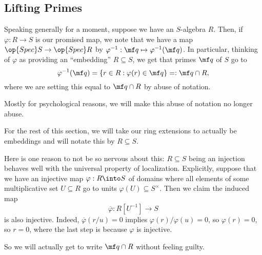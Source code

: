 \subsection{Lifting Primes}
Speaking generally for a moment, suppose we have an $S$-algebra $R$. Then, if $\varphi:R\to S$ is our promised map, we note that we have a map $\op{Spec}S\to\op{Spec}R$ by $\varphi^{-1}:\mf q\mapsto\varphi^{-1}(\mf q)$. In particular, thinking of $\varphi$ as providing an ``embedding'' $R\subseteq S$, we get that primes $\mf q$ of $S$ go to
\[\varphi^{-1}(\mf q)=\{r\in R:\varphi(r)\in\mf q\}=:\mf q\cap R,\]
where we are setting this equal to $\mf q\cap R$ by abuse of notation.

Mostly for psychological reasons, we will make this abuse of notation no longer abuse.
\begin{convention}
	For the rest of this section, we will take our ring extensions to actually be embeddings and will notate this by $R\subseteq S$.
\end{convention}
\begin{remark}[Nir] \label{rem:localizebasering}
	Here is one reason to not be so nervous about this: $R\subseteq S$ being an injection behaves well with the universal property of localization. Explicitly, suppose that we have an injective map $\varphi:R\into S$ of domains where all elements of some multiplicative set $U\subseteq R$ go to units $\varphi(U)\subseteq S^\times$. Then we claim the induced map
	\[\overline\varphi:R\left[U^{-1}\right]\to S\]
	is also injective. Indeed, $\overline\varphi(r/u)=0$ implies $\varphi(r)/\varphi(u)=0$, so $\varphi(r)=0$, so $r=0$, where the last step is because $\varphi$ is injective.
\end{remark}
So we will actually get to write $\mf q\cap R$ without feeling guilty.

